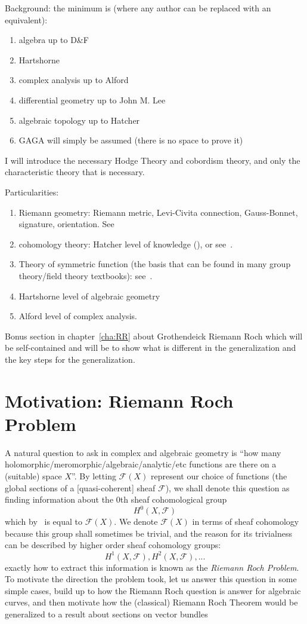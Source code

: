 \documentclass{book}
\newcommand{\CF}{{\mathcal{F}}}
\begin{document}
Background: the minimum is (where any author can be replaced with an equivalent):
\begin{enumerate}
  \item algebra up to D\&F
  \item Hartshorne
  \item complex analysis up to Alford
  \item differential geometry up to John M. Lee
  \item algebraic topology up to Hatcher
  \item GAGA will simply be assumed (there is no space to prove it)
\end{enumerate}

I will introduce the necessary Hodge Theory and cobordism theory, and only the characteristic theory that is
necessary.

Particularities:
\begin{enumerate}
  \item Riemann geometry: Riemann metric, Levi-Civita connection, Gauss-Bonnet, signature, orientation.
    See~\cite{NateDiffGeo}
  \item cohomology theory: Hatcher level of knowledge (\cite{hatcherAlgebraicTopology}), or
    see~\cite{NateAlgTop}.
   \item Theory of symmetric function (the basis that can be found in many group theory/field theory textbooks):
     see~\cite{NateAlgebra}.
  \item Hartshorne level of algebraic geometry
  \item Alford level of complex analysis.
\end{enumerate}

Bonus section in chapter~\ref{cha:RR} about Grothendeick Riemann Roch which will be self-contained and will be
to show what is different in the generalization and the key steps for the generalization.

\chapter{Motivation: Riemann Roch Problem}


A natural question to ask in complex and algebraic geometry is ``how many
holomorphic/meromorphic/algebraic/analytic/etc functions are there on a (suitable) space $X$''. By letting
$\CF(X)$ represent our choice of functions (the global sections of a [quasi-coherent] sheaf $\CF$), we shall
denote this question as finding information about the $0$th sheaf cohomological group
\[
  H^0(X, \CF)
\]
which by~\cite{NateAlgGeo} is equal to $\CF(X)$. We denote $\CF(X)$ in terms of sheaf cohomology because this
group shall sometimes be trivial, and the reason for its trivialness can be described by higher order sheaf
cohomology groups:
\[
  H^1(X, \CF), H^2(X, \CF), ...
\]
exactly how to extract this information is known as the \emph{Riemann Roch Problem}. To motivate the direction
the problem took, let us answer this question in some simple cases, build up to how the Riemann Roch question
is answer for algebraic curves, and then motivate how the (classical) Riemann Roch
Theorem would be generalized to a result about sections on vector bundles
\end{document}
